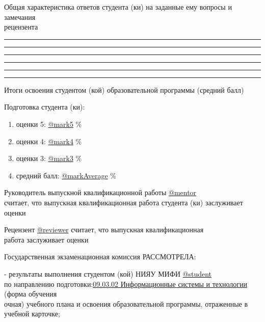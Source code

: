 \documentclass[a4paper,12pt]{article} %
\begin{document}
	Общая характеристика ответов студента (ки) на заданные ему вопросы и замечания\\ рецензента  
	\vspace{0.4cm}
	\smallskip\hrule
	\vspace{0.4cm} 
	\smallskip\hrule
	\vspace{0.4cm} 
	\smallskip\hrule
	\vspace{0.4cm} 
	\smallskip\hrule
	\vspace{0.4cm} 
	\smallskip\hrule
	\vspace{0.4cm} 
	\smallskip\hrule
	\vspace{0.4cm} 

\par\medskip
Итоги освоения студентом (кой) образовательной программы (средний балл)

Подготовка студента (ки):
\vspace{-0.2cm}
\begin{enumerate}
	\item оценки 5: \underline{@mark5} \%
	\vspace{-0.35cm}
	\item оценки 4: \underline{@mark4} \%
	\vspace{-0.35cm}
	\item оценки 3: \underline{@mark3} \%
	\vspace{-0.35cm}
	\item средний балл: \underline{@markAverage} \%
	\vspace{-0.35cm}
\end{enumerate}
\par\bigskip
Руководитель выпускной квалификационной работы 
\underline{@mentor}\\
считает, что выпускная квалификационная работа студента (ки) заслуживает \\
оценки  \makebox[10mm]{\hrulefill}\makebox[10mm]{\hrulefill}\makebox[10mm]{\hrulefill}
\par\medskip
Рецензент \underline{@reviewer} считает, что выпускная квалификационная\\ работа заслуживает оценки \makebox[10mm]{\hrulefill}\makebox[10mm]{\hrulefill}\makebox[10mm]{\hrulefill}
\par\medskip

Государственная экзаменационная комиссия РАССМОТРЕЛА:

- результаты выполнения студентом (кой) НИЯУ МИФИ \underline{@student}\\
 по направлению подготовки:\underline{09.03.02 Информационные системы и технологии}  (форма обучения\\
  очная) учебного плана и освоения образовательной программы, отраженные в учебной карточке;
\end{document}
